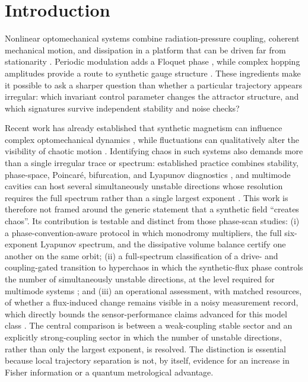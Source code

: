 \documentclass[aip,cha,reprint]{revtex4-2}
\begin{document}

\maketitle

\section{Introduction}

Nonlinear optomechanical systems combine radiation-pressure coupling, coherent
mechanical motion, and dissipation in a platform that can be driven far from
stationarity \cite{aspelmeyer2014,kippenberg2008,marquardt2006,carmon2007,foulla2017,alphonse2022}.
Periodic modulation adds a Floquet phase \cite{oka2009,goldman2014,bukov2015,kitagawa2010},
while complex hopping amplitudes provide a route to synthetic gauge structure
\cite{peano2015,sanavio2020}. These ingredients make it
possible to ask a sharper question than whether a particular trajectory appears
irregular: which invariant control parameter changes the attractor structure, and
which signatures survive independent stability and noise checks?

Recent work has already established that synthetic magnetism can influence complex
optomechanical dynamics \cite{mondal2024doi,muthukumar2025doi}, while fluctuations can
qualitatively alter the visibility of chaotic motion \cite{gao2026doi}. Identifying
chaos in such systems also demands more than a single irregular trace or spectrum:
established practice combines stability, phase-space, Poincar\'e, bifurcation, and
Lyapunov diagnostics \cite{Zhu2023,carmon2007,bakemeier2015,lu2015pt,monifi2016,djorwe2018,guckenheimer1983,strogatz2015,ott2002},
and multimode cavities can host several
simultaneously unstable directions whose resolution requires the full spectrum rather
than a single largest exponent \cite{HalefShomroni2025,rossler1979}. This
work is therefore not framed around
the generic statement that a synthetic field ``creates chaos''. Its contribution is
testable and distinct from those phase-scan studies: (i) a phase-convention-aware
protocol in which monodromy multipliers, the full six-exponent Lyapunov spectrum,
and the dissipative volume balance certify one another on the same orbit;
(ii) a full-spectrum classification of a drive- and coupling-gated transition to
hyperchaos in which the synthetic-flux phase controls the number of simultaneously
unstable directions, at the level required for multimode systems
\cite{HalefShomroni2025}; and (iii) an operational assessment, with matched
resources, of whether a flux-induced change remains visible in a noisy measurement
record, which directly bounds the sensor-performance claims advanced for this model
class \cite{muthukumar2025doi}. The central comparison is between a
weak-coupling stable sector and an explicitly strong-coupling sector in which the
number of unstable directions, rather than only the largest exponent, is resolved. The distinction
is essential because local trajectory separation is not, by itself, evidence for an
increase in Fisher information or a quantum metrological advantage.
\end{document}
